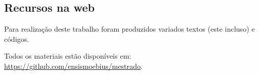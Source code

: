 	\begin{apendicesenv}
	
	\partapendices
	\chapter{Recursos na web}
		\par Para realização deste trabalho foram produzidos variados textos (este incluso) e códigos. 
		\par Todos os materiais estão disponíveis em:  \href{https://github.com/ensismoebius/mestrado}{https://github.com/ensismoebius/mestrado}.
\end{apendicesenv}